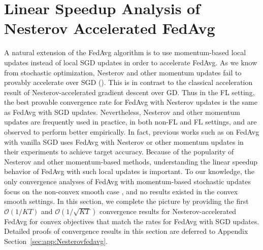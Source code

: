 


\section{Linear Speedup Analysis of Nesterov Accelerated FedAvg}
\label{sec:Nesterov}

A natural extension of the FedAvg algorithm is to use momentum-based 
local updates instead of local SGD updates in order to accelerate FedAvg. As we know from stochastic optimization, Nesterov and other momentum
updates fail to provably accelerate over SGD (\cite{liu2018accelerating,kidambi2018insufficiency,liu2018toward,yuan2020federated}). This is in contrast to the classical acceleration result of Nesterov-accelerated gradient descent over GD. Thus in the FL setting, the best provable convergence rate for FedAvg with Nesterov updates is the same as FedAvg with SGD updates. Nevertheless, Nesterov and other momentum updates are frequently used in practice, in both non-FL and FL settings, and are observed to perform better empirically. In fact, previous works such as \cite{stich2018local} on FedAvg with vanilla SGD uses FedAvg with Nesterov or other momentum updates in their experiments to achieve target accuracy. Because of the popularity of Nesterov and other momentum-based methods, understanding the linear speedup behavior of FedAvg with such local updates is important. To our knowledge, the
only convergence analyses of FedAvg with momentum-based stochastic
updates focus on the non-convex smooth case \cite{huo2020faster,yu2019linear,li2018federated}, and no results existed in the convex smooth settings. In this section, we complete the picture by providing the first $\mathcal{O}(1/KT)$
and $\mathcal{O}(1/\sqrt{KT})$ convergence results for Nesterov-accelerated
FedAvg for convex objectives that match the rates for FedAvg with SGD updates. Detailed proofs of convergence results in this section are deferred to Appendix Section~\ref{sec:app:Nesterovfedavg}.

